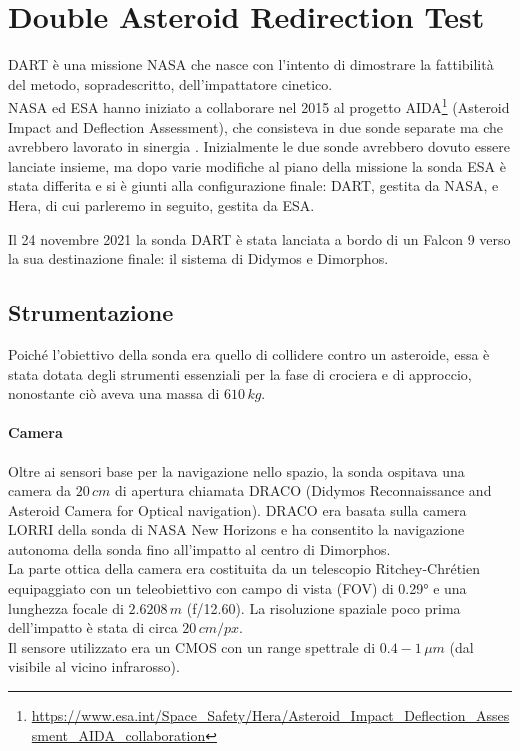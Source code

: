\documentclass[a4paper,11pt,openright]{book}
\begin{document}
\section{Double Asteroid Redirection Test}\label{sec:DART}
DART è una missione NASA che nasce con l'intento di dimostrare la fattibilità del metodo, sopradescritto, dell'impattatore cinetico.\\
NASA ed ESA hanno iniziato a collaborare nel 2015 al progetto AIDA\footnote{\href{https://www.esa.int/Space_Safety/Hera/Asteroid_Impact_Deflection_Assessment_AIDA_collaboration}{https://www.esa.int/Space\_Safety/Hera/Asteroid\_Impact\_Deflection\_Assessment\_AIDA\_collaboration}} (Asteroid Impact and Deflection Assessment), che consisteva in due sonde separate ma che avrebbero lavorato in sinergia \citep{michel_european_2018}. Inizialmente le due sonde avrebbero dovuto essere lanciate insieme, ma dopo varie modifiche al piano della missione la sonda ESA è stata differita e si è giunti alla configurazione finale: DART, gestita da NASA, e Hera, di cui parleremo in seguito, gestita da ESA.

Il 24 novembre 2021 la sonda DART è stata lanciata a bordo di un Falcon 9 verso la sua destinazione finale: il sistema di Didymos e Dimorphos.

\subsection{Strumentazione}
Poiché l'obiettivo della sonda era quello di collidere contro un asteroide, essa è stata dotata degli strumenti essenziali per la fase di crociera e di approccio, nonostante ciò aveva una massa di $610\,kg$.

\paragraph*{Camera}
Oltre ai sensori base per la navigazione nello spazio, la sonda ospitava una camera da $20\,cm$ di apertura chiamata DRACO (Didymos Reconnaissance and Asteroid Camera for Optical navigation). DRACO era basata sulla camera LORRI della sonda di NASA New Horizons e ha consentito la navigazione autonoma della sonda fino all'impatto al centro di Dimorphos.\\
La parte ottica della camera era costituita da un telescopio Ritchey-Chrétien equipaggiato con un teleobiettivo con campo di vista (FOV) di 0.29° e una lunghezza focale di $2.6208\,m$ (f/12.60). La risoluzione spaziale poco prima dell'impatto è stata di circa $20\,cm/px$.\\
Il sensore utilizzato era un CMOS con un range spettrale di $0.4-1\,\mu m$ (dal visibile al vicino infrarosso).
\end{document}
